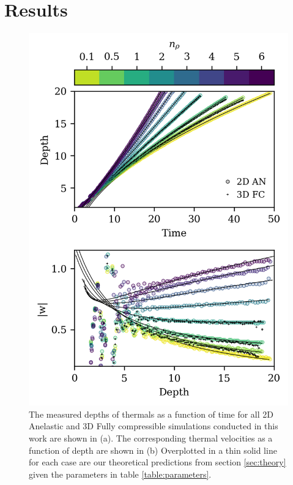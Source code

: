 \documentclass[twocolumn, amsmath, amsfonts, amssymb, trackchanges]{aastex62}
\begin{document}
\section{Results}
\label{sec:results}
\begin{figure}[t!]
    \includegraphics[width=\columnwidth]{results_panels.png}
    \caption{
	The measured depths of thermals as a function of time for all 2D Anelastic and 3D Fully compressible simulations conducted in this work are shown in (a).
	The corresponding thermal velocities as a function of depth are shown in (b)
	Overplotted in a thin solid line for each case are our theoretical predictions from section \ref{sec:theory} given the parameters in table \ref{table:parameters}.
    \label{fig:results_panels} }
\end{figure}
\end{document}
